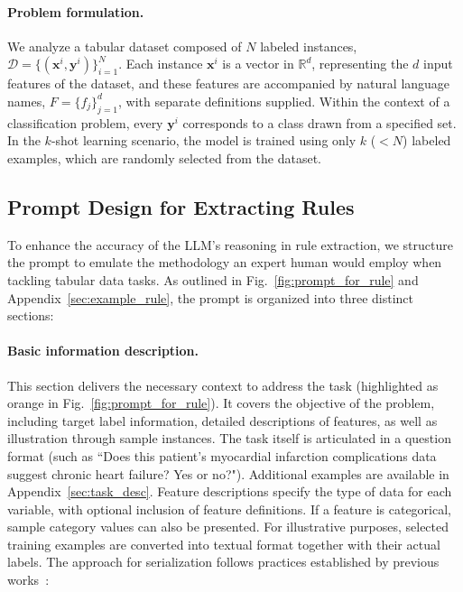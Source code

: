 \vspace*{-0.12in}
\paragraph{Problem formulation.} We analyze a tabular dataset composed of $N$ labeled instances, $\mathcal{D} = \{(\mathbf{x}^i, \mathbf{y}^i)\}_{i=1}^{N}$. Each instance $\mathbf{x}^i$ is a vector in $\mathbb{R}^d$, representing the $d$ input features of the dataset, and these features are accompanied by natural language names, $F = \{f_j\}_{j=1}^{d}$, with separate definitions supplied. Within the context of a classification problem, every $\mathbf{y}^i$ corresponds to a class drawn from a specified set. In the $k$-shot learning scenario, the model is trained using only $k$ ($<N$) labeled examples, which are randomly selected from the dataset.

\subsection{Prompt Design for Extracting Rules}
\label{Sec:prompt_design}
To enhance the accuracy of the LLM's reasoning in rule extraction, we structure the prompt to emulate the methodology an expert human would employ when tackling tabular data tasks. As outlined in Fig.~\ref{fig:prompt_for_rule} and Appendix~\ref{sec:example_rule}, the prompt is organized into three distinct sections:

\vspace*{-0.12in}
\paragraph{Basic information description.} This section delivers the necessary context to address the task (highlighted as orange in Fig.~\ref{fig:prompt_for_rule}). It covers the objective of the problem, including target label information, detailed descriptions of features, as well as illustration through sample instances. The task itself is articulated in a question format (such as ``Does this patient's myocardial infarction complications data suggest chronic heart failure? Yes or no?"). Additional examples are available in Appendix~\ref{sec:task_desc}. Feature descriptions specify the type of data for each variable, with optional inclusion of feature definitions. If a feature is categorical, sample category values can also be presented. For illustrative purposes, selected training examples are converted into textual format together with their actual labels. The approach for serialization follows practices established by previous works~\cite{dinh2022lift,hegselmann2023tabllm}:

